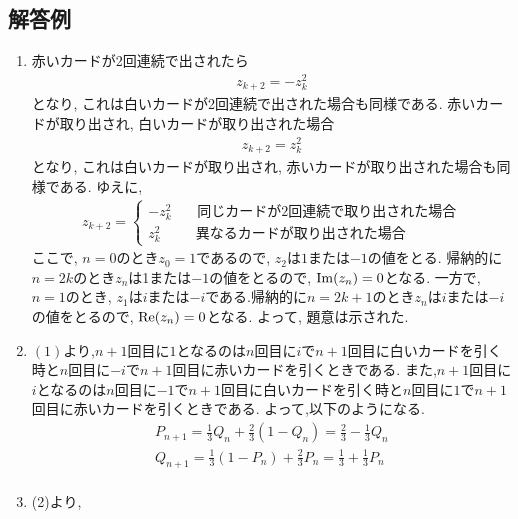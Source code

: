 \documentclass[dvipdfmx,titlepage, 11pt, a4paper]{jsarticle}%
\begin{document}
\subsection{解答例}
\begin{enumerate}[(1)]
	\setlength{\itemsep}{10pt}
	\item 赤いカードが2回連続で出されたら
	      \begin{eqnarray*}
		      z_{k+2}=-z_{k}^{2}
	      \end{eqnarray*}
	      となり, これは白いカードが2回連続で出された場合も同様である. 赤いカードが取り出され, 白いカードが取り出された場合
	      \begin{eqnarray*}
		      z_{k+2}=z_{k}^{2}
	      \end{eqnarray*}
	      となり, これは白いカードが取り出され, 赤いカードが取り出された場合も同様である. ゆえに,
	      \begin{eqnarray*}
		      z_{k+2}=\left\{
		      \begin{array}{l}
			      -z_{k}^{2}\hspace{22pt} 同じカードが2回連続で取り出された場合 \\
			      z_{k}^{2}\hspace{30pt} 異なるカードが取り出された場合
		      \end{array}
		      \right.
	      \end{eqnarray*}
		  ここで, $n=0$のとき$z_{0}=1$であるので, $z_{2}$は$1$または$-1$の値をとる. 帰納的に$n=2k$のとき$z_{n}$は1または$-1$の値をとるので, ${\rm Im}(z_{n})=0$となる. 一方で, $n=1$のとき, $z_{1}$は$i$または$-i$である.帰納的に$n=2k+1$のとき$z_{n}$は$i$または$-i$の値をとるので, ${\rm Re}(z_{n})=0$となる. よって, 題意は示された.
	\item $(1)$より,$n + 1$回目に$1$となるのは$n$回目に$i$で$n + 1$回目に白いカードを引く時と$n$回目に$-i$で$n + 1$回目に赤いカードを引くときである.
		  また,$n + 1$回目に$i$となるのは$n$回目に$-1$で$n + 1$回目に白いカードを引く時と$n$回目に$1$で$n + 1$回目に赤いカードを引くときである.
		  よって,以下のようになる.
		  \begin{eqnarray*}
			  P_{n + 1} = \frac{1}{3}Q_{n} + \frac{2}{3}(1 - Q_{n}) = \frac{2}{3} - \frac{1}{3}Q_{n}\\
			  Q_{n + 1} = \frac{1}{3}(1 - P_{n}) + \frac{2}{3}P_{n} = \frac{1}{3} + \frac{1}{3}P_{n}\\
		  \end{eqnarray*}
		  \item (2)より,
		  \begin{eqnarray*}

\end{eqnarray*}
\end{enumerate}
\end{document}
